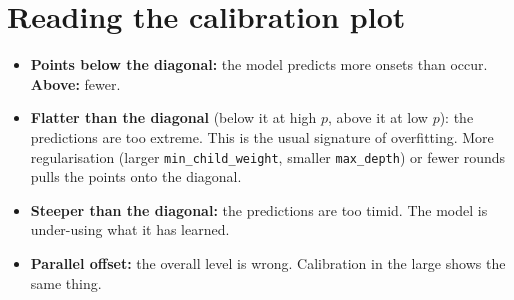 \documentclass[11pt]{article}
\begin{document}
\section{Reading the calibration plot}\label{sec:read}

\begin{center}
\end{center}

\begin{itemize}
\item \textbf{Points below the diagonal:} the model predicts more onsets than
  occur. \textbf{Above:} fewer.
\item \textbf{Flatter than the diagonal} (below it at high $p$, above it at low
  $p$): the predictions are too extreme. This is the usual signature of
  overfitting. More regularisation (larger \texttt{min\_child\_weight}, smaller
  \texttt{max\_depth}) or fewer rounds pulls the points onto the diagonal.
\item \textbf{Steeper than the diagonal:} the predictions are too timid. The
  model is under-using what it has learned.
\item \textbf{Parallel offset:} the overall level is wrong. Calibration in the
  large shows the same thing.
\end{itemize}
\end{document}
